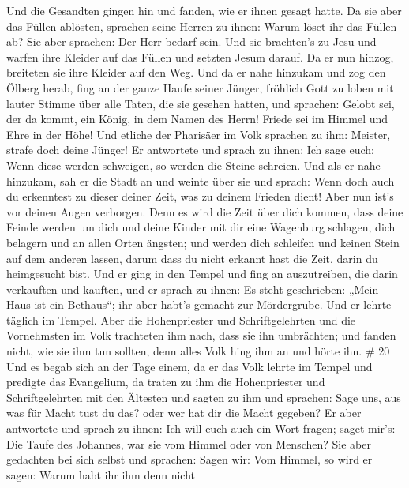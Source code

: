 Und die Gesandten gingen hin und fanden, wie er ihnen gesagt hatte.
 Da sie aber das Füllen ablösten, sprachen seine Herren zu
ihnen: Warum löset ihr das Füllen ab?  Sie aber sprachen:
Der Herr bedarf sein.  Und sie brachten's zu Jesu und
warfen ihre Kleider auf das Füllen und setzten Jesum darauf.
 Da er nun hinzog, breiteten sie ihre Kleider auf den Weg.
 Und da er nahe hinzukam und zog den Ölberg herab, fing an
der ganze Haufe seiner Jünger, fröhlich Gott zu loben mit lauter Stimme
über alle Taten, die sie gesehen hatten,  und sprachen:
Gelobt sei, der da kommt, ein König, in dem Namen des Herrn! Friede sei
im Himmel und Ehre in der Höhe!  Und etliche der Pharisäer
im Volk sprachen zu ihm: Meister, strafe doch deine Jünger!
 Er antwortete und sprach zu ihnen: Ich sage euch: Wenn
diese werden schweigen, so werden die Steine schreien.  Und
als er nahe hinzukam, sah er die Stadt an und weinte über sie
 und sprach: Wenn doch auch du erkenntest zu dieser deiner
Zeit, was zu deinem Frieden dient! Aber nun ist's vor deinen Augen
verborgen.  Denn es wird die Zeit über dich kommen, dass
deine Feinde werden um dich und deine Kinder mit dir eine Wagenburg
schlagen, dich belagern und an allen Orten ängsten;  und
werden dich schleifen und keinen Stein auf dem anderen lassen, darum
dass du nicht erkannt hast die Zeit, darin du heimgesucht bist.
 Und er ging in den Tempel und fing an auszutreiben, die
darin verkauften und kauften,  und er sprach zu ihnen: Es
steht geschrieben: „Mein Haus ist ein Bethaus``; ihr aber habt's gemacht
zur Mördergrube.  Und er lehrte täglich im Tempel. Aber die
Hohenpriester und Schriftgelehrten und die Vornehmsten im Volk
trachteten ihm nach, dass sie ihn umbrächten;  und fanden
nicht, wie sie ihm tun sollten, denn alles Volk hing ihm an und hörte
ihn. \# 20  Und es begab sich an der Tage einem, da er das
Volk lehrte im Tempel und predigte das Evangelium, da traten zu ihm die
Hohenpriester und Schriftgelehrten mit den Ältesten  und
sagten zu ihm und sprachen: Sage uns, aus was für Macht tust du das?
oder wer hat dir die Macht gegeben?  Er aber antwortete und
sprach zu ihnen: Ich will euch auch ein Wort fragen; saget mir's:
 Die Taufe des Johannes, war sie vom Himmel oder von
Menschen?  Sie aber gedachten bei sich selbst und sprachen:
Sagen wir: Vom Himmel, so wird er sagen: Warum habt ihr ihm denn nicht
